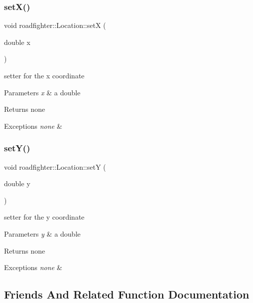 \subsubsection{\texorpdfstring{set\+X()}{setX()}}
{\footnotesize\ttfamily void roadfighter\+::\+Location\+::setX (\begin{DoxyParamCaption}\item[{double}]{x }\end{DoxyParamCaption})}

setter for the x coordinate 
\begin{DoxyParams}{Parameters}
{\em x} & a double \\
\hline
\end{DoxyParams}
\begin{DoxyReturn}{Returns}
none 
\end{DoxyReturn}

\begin{DoxyExceptions}{Exceptions}
{\em none} & \\
\hline
\end{DoxyExceptions}
\mbox{\label{classroadfighter_1_1Location_ace0dc3e91d430176c43ec88c2bc4677c}} 
\subsubsection{\texorpdfstring{set\+Y()}{setY()}}
{\footnotesize\ttfamily void roadfighter\+::\+Location\+::setY (\begin{DoxyParamCaption}\item[{double}]{y }\end{DoxyParamCaption})}

setter for the y coordinate 
\begin{DoxyParams}{Parameters}
{\em y} & a double \\
\hline
\end{DoxyParams}
\begin{DoxyReturn}{Returns}
none 
\end{DoxyReturn}

\begin{DoxyExceptions}{Exceptions}
{\em none} & \\
\hline
\end{DoxyExceptions}


\subsection{Friends And Related Function Documentation}
\mbox{\label{classroadfighter_1_1Location_aec4517a843218b97cd7d4d6fccc07449}} 

